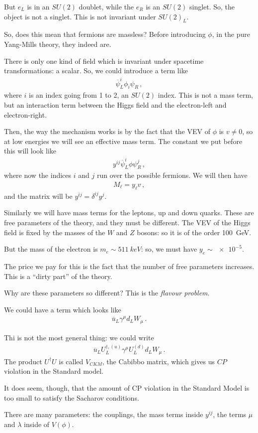 \documentclass[main.tex]{subfiles}
\begin{document}
But \(e_L\) is in an \(SU(2)\) doublet, while the \(e_R\) is an \(SU(2)\) singlet. So, the object is not a singlet. This is not invariant under \(SU(2)_{L}\).

So, does this mean that fermions are massless? Before introducing \(\phi \), in the pure Yang-Mills theory, they indeed are.

There is only one kind of field which is invariant under spacetime transformations: a scalar. So, we could introduce a term like 
%
\begin{align}
\overline{\psi}_{L}^{i} \phi_{i} \psi_{R}
\,,
\end{align}
%
where \(i\) is an index going from 1 to 2, an \(SU(2)\) index. 
This is not a mass term, but an interaction term between the Higgs field and the electron-left and electron-right.

Then, the way the mechanism works is by the fact that the VEV of \(\phi \) is \(v \neq 0\), so at low energies we will see an effective mass term. The constant we put before this will look like 
%
\begin{align}
y^{ij} \overline{\psi}^{i}_{L} \phi \psi_{R}^{j}
\,,
\end{align}
%
where now the indices \(i\) and \(j\) run over the possible fermions.
We will then have 
%
\begin{align}
M_\ell = y_{\ell} v 
\,,
\end{align}
%
and the matrix will be \(y^{ij} = \delta^{ij} y^{j}\).

Similarly we will have mass terms for the leptons, up and down quarks.
These are free parameters of the theory, and they must be different. 
The VEV of the Higgs field is fixed by the masses of the \(W\) and \(Z\) bosons: so it is of the order \SI{100}{GeV}.

But the mass of the electron is \(m_e \sim \SI{511}{keV}\): so, we must have \(y_e \sim \num{e-5}\). 

The price we pay for this is the fact that the number of free parameters increases. This is a ``dirty part'' of the theory.

Why are these parameters so different? This is the \emph{flavour problem}.

We could have a term which looks like 
%
\begin{align}
\overline{u}_{L} \gamma^{\mu } d_{L} W_{\mu }
\,.
\end{align}

Thi is not the most general thing: we could write 
%
\begin{align}
\overline{u}_{L} U_{L} ^{\dag, (u)} \gamma^{\mu } U_{L}^{(d)} d_{L} W_{\mu }
\,.
\end{align}
%
The product \(U ^\dag U\) is called \(V_{CKM}\), the Cabibbo matrix, which gives us \(CP\) violation in the Standard model.

It does seem, though, that the amount of CP violation in the Standard Model is too small to satisfy the Sacharov conditions.

There are many parameters: the couplings, the mass terms inside \(y^{ij}\), the terms \(\mu \) and \(\lambda \) inside of \(V(\phi )\).
\end{document}
